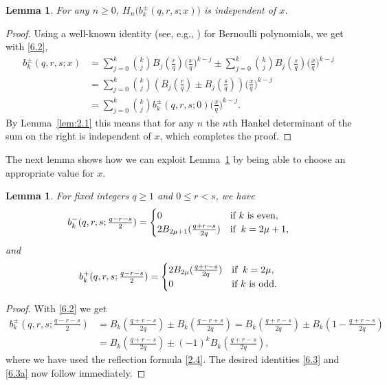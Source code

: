 \documentclass{amsart}
\theoremstyle{plain}
\newtheorem{lemma}[theorem]{Lemma}
\numberwithin{equation}{section}
\begin{document}
\begin{lemma}\label{lem:6.1}
For any $n\geq 0$, $H_n\big(b_k^{\pm}(q,r,s;x)\big)$ is independent of $x$.
\end{lemma}

\begin{proof}
Using a well-known identity (see, e.g., \cite[Eq.~24.4.12]{DLMF}) for 
Bernoulli polynomials, we get with \eqref{6.2},
\begin{align*}
b_k^{\pm}(q,r,s;x) 
&= \sum_{j=0}^k\binom{k}{j}B_j(\tfrac{r}{q})\big(\tfrac{x}{q}\big)^{k-j}
\pm\sum_{j=0}^k\binom{k}{j}B_j(\tfrac{s}{q})\big(\tfrac{x}{q}\big)^{k-j}\\
&= \sum_{j=0}^k\binom{k}{j}\left(B_j(\tfrac{r}{q})
\pm B_j(\tfrac{s}{q})\right)\big(\tfrac{x}{q}\big)^{k-j} \\
&= \sum_{j=0}^k\binom{k}{j}b_k^{\pm}(q,r,s;0)\big(\tfrac{x}{q}\big)^{k-j}.
\end{align*}
By Lemma~\ref{lem:2.1} this means that for any $n$ the $n$th Hankel determinant
of the sum on the right is independent of $x$, which completes the proof.
\end{proof}

The next lemma shows how we can exploit Lemma~\ref{lem:6.1} by being able to
choose an appropriate value for $x$.

\begin{lemma}\label{lem:6.2}
For fixed integers $q\geq 1$ and $0\leq r<s$, we have
\begin{equation}\label{6.3}
b_k^{-}(q,r,s;\tfrac{q-r-s}{2}) = \begin{cases}
0 &\hbox{if $k$ is even},\\
2B_{2\mu+1}(\tfrac{q+r-s}{2q}) &\hbox{if}\;\;k=2\mu+1,
\end{cases}
\end{equation}
and
\begin{equation}\label{6.3a}
b_k^{+}(q,r,s;\tfrac{q-r-s}{2}) = \begin{cases}
2B_{2\mu}(\tfrac{q+r-s}{2q}) &\hbox{if}\;\;k=2\mu,\\
0 &\hbox{if $k$ is odd}.
\end{cases}
\end{equation}
\end{lemma}

\begin{proof}
With \eqref{6.2} we get
\begin{align*}
b_k^{\pm}(q,r,s;\tfrac{q-r-s}{2})
&= B_k(\tfrac{q+r-s}{2q})\pm B_k(\tfrac{q-r+s}{2q})
= B_k(\tfrac{q+r-s}{2q})\pm B_k(1-\tfrac{q+r-s}{2q}) \\
&= B_k(\tfrac{q+r-s}{2q})\pm (-1)^kB_k(\tfrac{q+r-s}{2q}),
\end{align*}
where we have used the reflection formula \eqref{2.4}. The
desired identities \eqref{6.3} and \eqref{6.3a} now follow immediately.
\end{proof}
\end{document}
